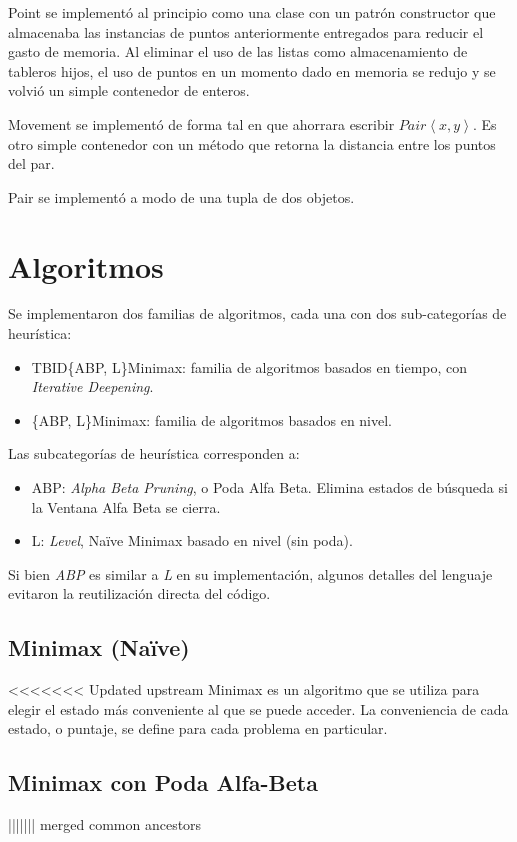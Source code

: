 \documentclass[10pt,a4paper,notitlepage]{article}
\begin{document}
Point se implementó al principio como una clase con un patrón constructor que almacenaba las instancias de puntos anteriormente entregados para reducir el gasto de memoria. Al eliminar el uso de las listas como almacenamiento de tableros hijos, el uso de puntos en un momento dado en memoria se redujo y se volvió un simple contenedor de enteros.

Movement se implementó de forma tal en que ahorrara escribir $Pair\left<x, y\right>$. Es otro simple contenedor con un método que retorna la distancia entre los puntos del par.

Pair se implementó a modo de una tupla de dos objetos.



\section{Algoritmos}

Se implementaron dos familias de algoritmos, cada una con dos sub-categorías de heurística:
\begin{itemize}
\item TBID\{ABP, L\}Minimax: familia de algoritmos basados en tiempo, con \textit{Iterative Deepening}.
\item \{ABP, L\}Minimax: familia de algoritmos basados en nivel.
\end{itemize}

Las subcategorías de heurística corresponden a:
\begin{itemize}
\item ABP: \textit{Alpha Beta Pruning}, o Poda Alfa Beta. Elimina estados de búsqueda si la Ventana Alfa Beta se cierra.
\item L: \textit{Level}, Na\"ive Minimax basado en nivel (sin poda).
\end{itemize}

Si bien \textit{ABP} es similar a \textit{L} en su implementación, algunos detalles del lenguaje evitaron la reutilización directa del código. 

\subsection{Minimax (Na\"ive)}
<<<<<<< Updated upstream
  Minimax es un algoritmo que se utiliza para elegir el estado más conveniente al que se puede acceder.
  La conveniencia de cada estado, o puntaje, se define para cada problema en particular.
\subsection{Minimax con Poda Alfa-Beta}
||||||| merged common ancestors
\end{document}
